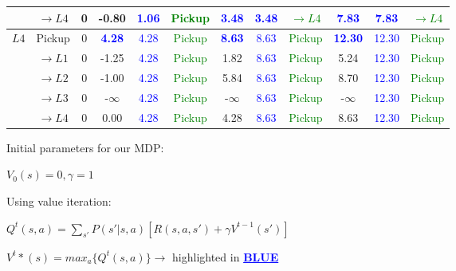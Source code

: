 \documentclass[12pt, letterpaper]{article}
\begin{document}
\begin{footnotesize}
\begin{tabular}{|l|c|c|c|c|c|c|c|c|c|c|c|}
                            & $\rightarrow L4$  & 0 & -0.80     & \textcolor{blue}{1.06} & \textcolor{green}{Pickup} & \textcolor{blue}{\textbf{3.48}} & \textcolor{blue}{3.48} & \textcolor{green}{$\rightarrow L4$} & \textcolor{blue}{\textbf{7.83}} & \textcolor{blue}{7.83}  & \textcolor{green}{$\rightarrow L4$} \\ \cline{2-12}
    \hline
    \multirow{5}{*}{$L4$}   & Pickup            & 0 & \textbf{\textcolor{blue}{4.28}}      & \textcolor{blue}{4.28} & \textcolor{green}{Pickup} & \textcolor{blue}{\textbf{8.63}} & \textcolor{blue}{8.63} & \textcolor{green}{Pickup}    & \textcolor{blue}{\textbf{12.30}} & \textcolor{blue}{12.30} & \textcolor{green}{Pickup} \\ \cline{2-12}
                            & $\rightarrow L1$  & 0 & -1.25     & \textcolor{blue}{4.28} & \textcolor{green}{Pickup} & 1.82          & \textcolor{blue}{8.63} & \textcolor{green}{Pickup}    & 5.24      & \textcolor{blue}{12.30} & \textcolor{green}{Pickup} \\ \cline{2-12}
                            & $\rightarrow L2$  & 0 & -1.00     & \textcolor{blue}{4.28} & \textcolor{green}{Pickup} & 5.84          & \textcolor{blue}{8.63} & \textcolor{green}{Pickup}    & 8.70      & \textcolor{blue}{12.30} & \textcolor{green}{Pickup}  \\ \cline{2-12}
                            & $\rightarrow L3$  & 0 & -$\infty$ & \textcolor{blue}{4.28} & \textcolor{green}{Pickup} & -$\infty$     & \textcolor{blue}{8.63} & \textcolor{green}{Pickup}    & -$\infty$ & \textcolor{blue}{12.30} & \textcolor{green}{Pickup}  \\ \cline{2-12}
                            & $\rightarrow L4$  & 0 & 0.00      & \textcolor{blue}{4.28} & \textcolor{green}{Pickup} & 4.28          & \textcolor{blue}{8.63} & \textcolor{green}{Pickup}    & 8.63      & \textcolor{blue}{12.30} & \textcolor{green}{Pickup} \\ \cline{2-12}
    \hline
    \end{tabular}
\end{footnotesize}

Initial parameters for our MDP:

$V_0(s) = 0, \gamma = 1$

Using value iteration:

$Q^t(s,a) = \sum_{s'} P(s'|s,a)[R(s,a,s')+ \gamma V^{t-1}(s')]$

$V^t*(s)=max_a\{Q^t(s,a)\} \rightarrow$ highlighted in \textcolor{blue}{\underline{\textbf{BLUE}}}
\end{document}
